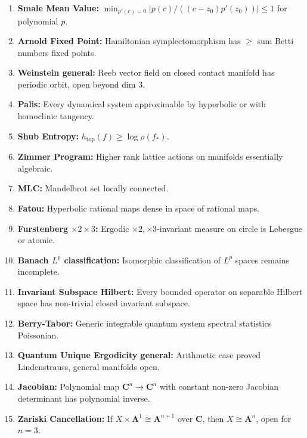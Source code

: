 \documentclass[aps,prd,amsmath,amssymb,twocolumn,superscriptaddress]{revtex4-2}
\begin{document}
\begin{enumerate}[label={\bf \arabic*.}, leftmargin=*, itemsep=2pt]
\item \textbf{Smale Mean Value:} $\min_{p'(c)=0}|p(c)/((c-z_0)p'(z_0))|\le1$ for polynomial $p$.

\item \textbf{Arnold Fixed Point:} Hamiltonian symplectomorphism has $\ge$ sum Betti numbers fixed points.

\item \textbf{Weinstein general:} Reeb vector field on closed contact manifold has periodic orbit, open beyond dim $3$.

\item \textbf{Palis:} Every dynamical system approximable by hyperbolic or with homoclinic tangency.

\item \textbf{Shub Entropy:} $h_{\text{top}}(f)\ge\log\rho(f_*)$.

\item \textbf{Zimmer Program:} Higher rank lattice actions on manifolds essentially algebraic.

\item \textbf{MLC:} Mandelbrot set locally connected.

\item \textbf{Fatou:} Hyperbolic rational maps dense in space of rational maps.

\item \textbf{Furstenberg $\times2\times3$:} Ergodic $\times2,\times3$-invariant measure on circle is Lebesgue or atomic.

\item \textbf{Banach $L^p$ classification:} Isomorphic classification of $L^p$ spaces remains incomplete.

\item \textbf{Invariant Subspace Hilbert:} Every bounded operator on separable Hilbert space has non-trivial closed invariant subspace.

\item \textbf{Berry-Tabor:} Generic integrable quantum system spectral statistics Poissonian.

\item \textbf{Quantum Unique Ergodicity general:} Arithmetic case proved Lindenstrauss, general manifolds open.

\item \textbf{Jacobian:} Polynomial map $\mathbf C^n\to\mathbf C^n$ with constant non-zero Jacobian determinant has polynomial inverse.

\item \textbf{Zariski Cancellation:} If $X\times\mathbf A^1\cong\mathbf A^{n+1}$ over $\mathbf C$, then $X\cong\mathbf A^n$, open for $n=3$.


\end{enumerate}
\end{document}
